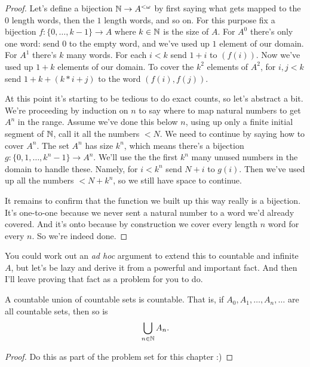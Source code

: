 \documentclass[10pt]{amsart}
\begin{document}
\begin{proof}
Let's define a bijection $\mathbb{N} \to A^{<\omega}$ by first saying what gets mapped to the $0$ length words, then the $1$ length words, and so on. For this purpose fix a bijection $f :\{0, \ldots, k-1\} \to A$ where $k \in \mathbb{N}$ is the size of $A$. For $A^0$ there's only one word: send $0$ to the empty word, and we've used up $1$ element of our domain. For $A^1$ there's $k$ many words. For each $i < k$ send $1+i$ to $(f(i))$. Now we've used up $1+k$ elements of our domain. To cover the $k^2$ elements of $A^2$, for $i,j < k$ send $1+k + (k*i + j)$ to the word $(f(i),f(j))$.

At this point it's starting to be tedious to do exact counts, so let's abstract a bit. We're proceeding by induction on $n$ to say where to map natural numbers to get $A^n$ in the range. Assume we've done this below $n$, using up only a finite initial segment of $\mathbb{N}$, call it all the numbers $< N$. We need to continue by saying how to cover $A^n$. The set $A^n$ has size $k^n$, which means there's a bijection $g : \{0, 1, \ldots, k^n-1\} \to A^n$. We'll use the the first $k^n$ many unused numbers in the domain to handle these. Namely, for $i < k^n$ send $N+i$ to $g(i)$. Then we've used up all the numbers $< N + k^n$, so we still have space to continue.

It remains to confirm that the function we built up this way really is a bijection. It's one-to-one because we never sent a natural number to a word we'd already covered. And it's onto because by construction we cover every length $n$ word for every $n$. So we're indeed done.
\end{proof}



You could work out an \textit{ad hoc} argument to extend this to countable and infinite $A$, but let's be lazy and derive it from a powerful and important fact. And then I'll leave proving that fact as a problem for you to do.

\begin{theorem}
A countable union of countable sets is countable. That is, if $A_0, A_1, \ldots, A_n, \ldots$ are all countable sets, then so is
\[
\bigcup_{n \in \mathbb{N}} A_n.
\]
\end{theorem}

\begin{proof}
Do this as part of the problem set for this chapter :)
\end{proof}
\end{document}
